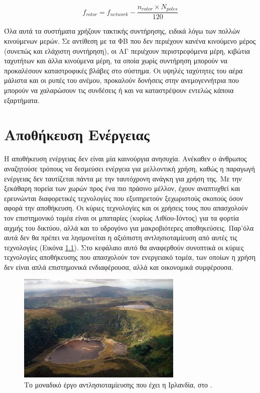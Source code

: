\documentclass[12pt]{report}
\begin{document}
\begin{equation}
	f_{rotor} = f_{network} - \frac{n_{rotor} \times{} N_{poles}}{120}
	\label{eq:dfig}
\end{equation}

Όλα αυτά τα συστήματα χρήζουν τακτικής συντήρησης, ειδικά λόγω των πολλών κινούμενων μερών. Σε αντίθεση με τα ΦΒ που δεν περιέχουν κανένα κινούμενο μέρος (συνεπώς και ελάχιστη συντήρηση), οι ΑΓ περιέχουν περιστρεφόμενα μέρη, κιβώτια
ταχυτήτων και άλλα κινούμενα μέρη, τα οποία χωρίς συντήρηση μπορούν να προκαλέσουν καταστροφικές βλάβες στο σύστημα. Οι υψηλές ταχύτητες του αέρα μάλιστα και οι ρυπές του ανέμου, προκαλούν δονήσεις στην ανεμογεννήτρια που μπορούν να
χαλαρώσουν τις συνδέσεις ή και να καταστρέψουν εντελώς κάποια εξαρτήματα.

\chapter{Αποθήκευση Ενέργειας}
\label{chap:storage}
Η αποθήκευση ενέργειας δεν είναι μία καινούργια ανησυχία. Ανέκαθεν ο άνθρωπος αναζητούσε τρόπους να δεσμεύσει ενέργεια για μελλοντική χρήση, καθώς η παραγωγή ενέργειας δεν ταυτίζεται πάντα με την ταυτόχρονη ανάγκη για χρήση της. 
Με την ξεκάθαρη πορεία των χωρών προς ένα πιο πράσινο μέλλον, έχουν αναπτυχθεί και ερευνώνται διαφορετικές τεχνολογίες που εξυπηρετούν ξεχωριστούς σκοπούς όσον αφορά την αποθήκευση. 
Οι κύριες τεχνολογίες και οι χρήσεις τους που απασχολούν τον επιστημονικό τομέα
είναι οι μπαταρίες (κυρίως Λιθίου-Ιόντος) για τα φορτία αιχμής του δικτύου, αλλά και το υδρογόνο για μακροβιότερες αποθηκεύσεις. Παρ'όλα αυτά δεν θα πρέπει να λησμονείται η αξιόπιστη αντλησιοταμίευση από αυτές τις τεχνολογίες 
(Εικόνα \ref{fig:turlough-hill}). 
Στο κεφάλαιο αυτό θα αναφερθούν συνοπτικά οι κύριες τεχνολογίες αποθήκευσης που απασχολούν τον ενεργειακό τομέα, των οποίων η χρήση δεν είναι απλά επιστημονικά ενδιαφέρουσα, αλλά και οικονομικά συμφέρουσα.

\begin{figure}[h]
				\center
				\includegraphics[width=0.7\textwidth]{turlough-hill}
				\captionsetup{name=Εικόνα, width=0.8\textwidth}
				\caption{Το μοναδικό έργο αντλησιοταμίευσης που έχει η Ιρλανδία, στο {}.}
				\label{fig:turlough-hill}
\end{figure}
\pagebreak
\end{document}
